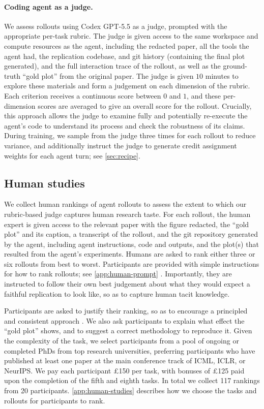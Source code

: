 \documentclass[garamond,a4paper]{inherent}
\renewcommand{\sectionautorefname}{Section}%
\renewcommand{\subsectionautorefname}{Section}%
\renewcommand{\subsubsectionautorefname}{Section}%
\DeclareRobustCommand{\appref}[1]{%
  \begingroup
  \renewcommand{\sectionautorefname}{Appendix}%
  \renewcommand{\subsectionautorefname}{Appendix}%
  \renewcommand{\subsubsectionautorefname}{Appendix}%
  \autoref{#1}%
  \endgroup}
\begin{document}
\paragraph{Coding agent as a judge.}
We assess rollouts using Codex GPT-5.5 as a judge, prompted with the appropriate per-task rubric.
The judge is given access to the same workspace and compute resources as the agent, including the redacted paper, all the tools the agent had, the replication codebase, and git history (containing the final plot generated), and the full interaction trace of the rollout, as well as the ground-truth ``gold plot'' from the original paper.
The judge is given $10$ minutes to explore these materials and form a judgement on each dimension of the rubric.
Each criterion receives a continuous score between $0$ and $1$, and these per-dimension scores are averaged to give an overall score for the rollout.
Crucially, this approach allows the judge to examine fully and potentially re-execute the agent's code to understand its process and check the robustness of its claims.
During training, we sample from the judge three times for each rollout to reduce variance, and additionally instruct the judge to generate credit assignment weights for each agent turn; see \autoref{sec:recipe}.

\subsection{Human studies}\label{sec:human-studies}

We collect human rankings of agent rollouts to assess the extent to which our rubric-based judge captures human research taste.
For each rollout, the human expert is given access to the relevant paper with the figure redacted, the ``gold plot'' and its caption, a transcript of the rollout, and the git repository generated by the agent, including agent instructions, code and outputs, and the plot(s) that resulted from the agent's experiments. Humans are asked to rank either three or six rollouts from best to worst.
Participants are provided with simple instructions for how to rank rollouts; see \appref{app:human-prompt}.
Importantly, they are instructed to follow their own best judgement about what they would expect a faithful replication to look like, so as to capture human tacit knowledge.

Participants are asked to justify their ranking, so as to encourage a principled and consistent approach \citep{mcdonnell2016rationales}. We also ask participants to explain what effect the ``gold plot'' shows, and to suggest a correct methodology to reproduce it. Given the complexity of the task, we select participants from a pool of ongoing or completed PhDs from top research universities, preferring participants who have published at least one paper at the main conference track of ICML, ICLR, or NeurIPS. We pay each participant £150 per task, with bonuses of £125 paid upon the completion of the fifth and eighth tasks. In total we collect 117 rankings from 20 participants. \appref{app:human-studies} describes how we choose the tasks and rollouts for participants to rank.
\end{document}
